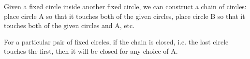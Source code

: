  Given a fixed circle inside another fixed circle, we can construct
a chain of circles: place circle A so that it touches both
of the given circles, place circle B so that it touches both
of the given circles and A, etc.
\par
For a particular pair of fixed circles, 
if the chain is closed, i.e. the last circle touches the
first, then it will be closed for any choice of A.
